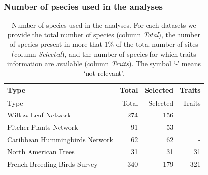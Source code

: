 \begin{landscape}

\subsubsection{Number of psecies used in the analyses}


\begin{longtable}[]{@{}lrrr@{}}
\caption[Number of species used in the analyses]{Number of species used in the analyses. For each datasets we provide the total number of species
(column \emph{Total}), the number of species present in more that 1\% of
the total number of sites (column \emph{Selected}), and the number of
species for which traits information are available (column
\emph{Traits}). The symbol `-' means `not relevant'.
\label{tbl:numsp}}\tabularnewline
\toprule
Type & Total & Selected & Traits\tabularnewline
\midrule
\endfirsthead
\toprule
Type & Total & Selected & Traits\tabularnewline
\midrule
\endhead
Willow Leaf Network & 274 & 156 & - ~\tabularnewline
Pitcher Plants Network & 91 & 53 & -\tabularnewline
Caribbean Hummingbirds Network & 62 & 62 & -\tabularnewline
North American Trees & 31 & 31 & 31\tabularnewline
French Breeding Birds Survey & 340 & 179 & 321\tabularnewline
\bottomrule
\end{longtable}

\end{landscape}




